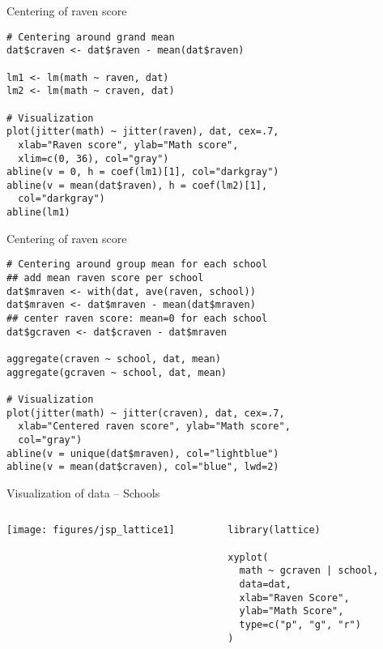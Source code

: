 \documentclass{beamer}
\begin{document}
{

\begin{frame}[fragile]{Centering of raven score}
  \begin{lstlisting}
# Centering around grand mean
dat$craven <- dat$raven - mean(dat$raven)

lm1 <- lm(math ~ raven, dat)
lm2 <- lm(math ~ craven, dat)

# Visualization
plot(jitter(math) ~ jitter(raven), dat, cex=.7, 
  xlab="Raven score", ylab="Math score", 
  xlim=c(0, 36), col="gray")
abline(v = 0, h = coef(lm1)[1], col="darkgray")
abline(v = mean(dat$raven), h = coef(lm2)[1],
  col="darkgray")
abline(lm1)
  \end{lstlisting}
\end{frame}

\begin{frame}[fragile]{Centering of raven score}
  \begin{lstlisting}
# Centering around group mean for each school
## add mean raven score per school
dat$mraven <- with(dat, ave(raven, school))
dat$mraven <- dat$mraven - mean(dat$mraven)
## center raven score: mean=0 for each school
dat$gcraven <- dat$craven - dat$mraven

aggregate(craven ~ school, dat, mean)
aggregate(gcraven ~ school, dat, mean)

# Visualization
plot(jitter(math) ~ jitter(craven), dat, cex=.7, 
  xlab="Centered raven score", ylab="Math score", 
  col="gray")
abline(v = unique(dat$mraven), col="lightblue")
abline(v = mean(dat$craven), col="blue", lwd=2)
  \end{lstlisting}
\end{frame}

}

\begin{frame}[fragile]{Visualization of data -- Schools}
  \begin{columns}
    \begin{column}{7cm}
      \texttt{[image: figures/jsp\_lattice1]}
    \end{column}
    \begin{column}{5cm}
      \begin{lstlisting}[style=plain]
library(lattice)

xyplot(
  math ~ gcraven | school,
  data=dat,
  xlab="Raven Score",
  ylab="Math Score",
  type=c("p", "g", "r")
)
      \end{lstlisting}
    \end{column}
  \end{columns}
\end{frame}
\end{document}
